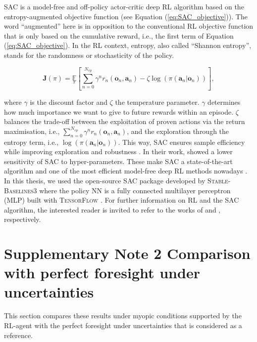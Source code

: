 \documentclass[12pt,letterpaper]{article}
\def\ie{i.e., }
\begin{document}
\newpage
\gls*{SAC} is a model-free and off-policy actor-critic deep \gls*{RL} algorithm based on the entropy-augmented objective function (see Equation (\ref{eq:SAC_objective})). The word ``augmented'' here is in opposition to the conventional \gls*{RL} objective function that is only based on the cumulative reward, \ie the first term of Equation (\ref{eq:SAC_objective}). In the \gls*{RL} context, entropy, also called ``Shannon entropy'', stands for the randomness or stochasticity of the policy.

\begin{equation}
    \label{eq:SAC_objective}
    \bm{J}(\pi) = \underset{\pi}{\mathbb{E}}\left[\underset{n=0}{\overset{N_{ep}}{\sum}}\gamma^n r_n\left(\bm{o}_n,\bm{a}_n \right) - \zeta \log \left(\pi\left(\bm{a}_n | \bm{o}_n\right) \right) \right],
\end{equation}

\noindent
where $\gamma$ is the discount factor and $\zeta$ the temperature parameter. $\gamma$ determines how much importance we want to give to future rewards within an episode. $\zeta$ balances the trade-off between the exploitation of proven actions via the return maximisation, \ie $\sum_{n=0}^{N_{ep}}\gamma^n r_n\left(\bm{o}_n,\bm{a}_n \right)$, and the exploration through the entropy term, \ie $\log \left(\pi\left(\bm{a}_n | \bm{o}_n\right) \right)$. This way, \gls*{SAC} ensures sample efficiency while improving exploration \cite{haarnoja2017reinforcement} and robustness \cite{ziebart2010modeling}. In their work, \citet{haarnoja2017reinforcement} showed a lower sensitivity of \gls*{SAC} to hyper-parameters. These make \gls*{SAC} a state-of-the-art algorithm and one of the most efficient model-free deep RL methods nowadays \cite{haarnoja2017reinforcement}. In this thesis, we used the open-source \gls*{SAC} package developed by \textsc{Stable-Baselines3} \cite{raffin2021stable} where the policy \gls*{NN} is a fully connected multilayer perceptron (MLP) built with \textsc{TensorFlow} \cite{abadi2016tensorflow}. For further information on \gls*{RL} and the \gls*{SAC} algorithm, the interested reader is invited to refer to the works of \citet{sutton2018reinforcement} and \citet{haarnoja2018soft}, respectively.


\newpage

\section*{Supplementary Note 2 \hspace{2 mm} Comparison with perfect foresight under uncertainties}
\label{sec:comp_PF}
This section compares these results under myopic conditions supported by the \gls*{RL}-agent with the perfect foresight under uncertainties that is considered as a reference.
\end{document}
